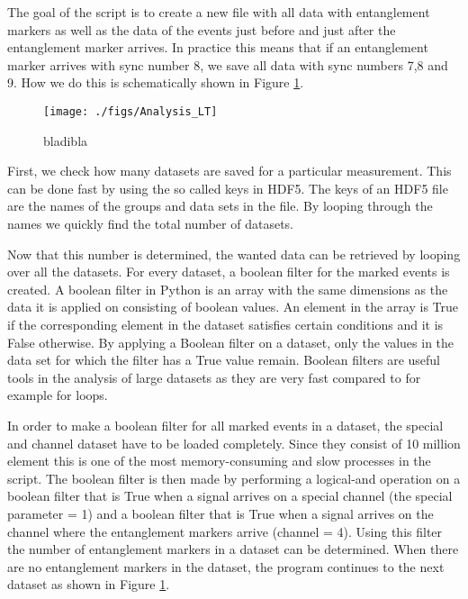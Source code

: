 The goal of the script is to create a new file with all data with entanglement markers as well as the data of the events just before and just after the entanglement marker arrives. In practice this means that if an entanglement marker arrives with sync number 8, we save all data with sync numbers 7,8 and 9. How we do this is schematically shown in Figure \ref{fig:analysis_overview}.

\begin{figure}[ht]\centering
\texttt{[image: ./figs/Analysis\_LT]}
\caption{bladibla}
\label{fig:analysis_overview}
\end{figure}
First, we check how many datasets are saved for a particular measurement. This can be done fast by using the so called keys in HDF5. The keys of an HDF5 file are the names of the groups and data sets in the file. By looping through the names we quickly find the total number of datasets. 

Now that this number is determined, the wanted data can be retrieved by looping over all the datasets. For every dataset, a boolean filter for the marked events is created. A boolean filter in Python is an array with the same dimensions as the data it is applied on consisting of boolean values. An element in the array is True if the corresponding element in the dataset satisfies certain conditions and it is False otherwise. By applying a Boolean filter on a dataset, only the values in the data set for which the filter has a True value remain. Boolean filters are useful tools in the analysis of large datasets as they are very fast compared to for example for loops. 

In order to make a boolean filter for all marked events in a dataset, the special and channel dataset have to be loaded completely. Since they consist of 10 million element this is one of the most memory-consuming and slow processes in the script. The boolean filter is then made by performing a logical-and operation on a boolean filter that is True when a signal arrives on a special channel (the special parameter = 1) and a boolean filter that is True when a signal arrives on the channel where the entanglement markers arrive (channel = 4). Using this filter the number of entanglement markers in a dataset can be determined. When there are no entanglement markers in the dataset, the program continues to the next dataset as shown in Figure \ref{fig:analysis_overview}.

